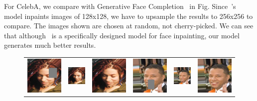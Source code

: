 For CelebA, we compare with Generative Face Completion~\cite{li2017generative} in Fig. Since~\cite{li2017generative}'s model inpaints images of 128x128, we have to upsample the results to 256x256 to compare. The images shown are chosen at random, not cherry-picked. We can see that although~\cite{li2017generative} is a specifically designed model for face inpainting, our model generates much better results.

\begin{figure}[h!]
\centering
\small
\begin{tabular}{cccccc}
\includegraphics[width=.16\textwidth]{figures/face/000189_input_image.png}&
\includegraphics[width=.16\textwidth]{figures/face/res1/res.jpg}&
\includegraphics[width=.16\textwidth]{figures/face/000189_synthesized_image.png}&
\includegraphics[width=.16\textwidth]{figures/face/000194_input_image.png}&
\includegraphics[width=.16\textwidth]{figures/face/res2/res.jpg}&
\includegraphics[width=.16\textwidth]{figures/face/000194_synthesized_image.png}\\

\end{tabular}
\end{figure}
